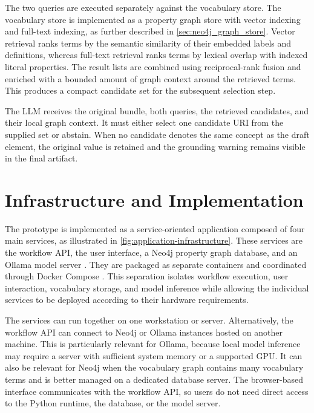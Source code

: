 
The two queries are executed separately against the vocabulary store.
The vocabulary store is implemented as a property graph store with vector indexing and full-text indexing, as further described in \cref{sec:neo4j_graph_store}.
Vector retrieval ranks terms by the semantic similarity of their embedded labels and definitions, whereas full-text retrieval ranks terms by lexical overlap with indexed literal properties.
The result lists are combined using reciprocal-rank fusion and enriched with a bounded amount of graph context around the retrieved terms.
This produces a compact candidate set for the subsequent selection step.

The \ac{LLM} receives the original bundle, both queries, the retrieved candidates, and their local graph context.
It must either select one candidate URI from the supplied set or abstain.
When no candidate denotes the same concept as the draft element, the original value is retained and the grounding warning remains visible in the final artifact.


\section{Infrastructure and Implementation}
\label{sec:infrastructure_and_implementation}

The prototype is implemented as a service-oriented application composed of four main services, as illustrated in \cref{fig:application-infrastructure}.
These services are the workflow \ac{API}, the user interface, a Neo4j property graph database, and an Ollama model server \cite{neo4jdatabase, ollamaplatform}.
They are packaged as separate containers and coordinated through Docker Compose \cite{docker_compose_patterns}.
This separation isolates workflow execution, user interaction, vocabulary storage, and model inference while allowing the individual services to be deployed according to their hardware requirements.

The services can run together on one workstation or server.
Alternatively, the workflow \ac{API} can connect to Neo4j or Ollama instances hosted on another machine.
This is particularly relevant for Ollama, because local model inference may require a server with sufficient system memory or a supported \ac{GPU}.
It can also be relevant for Neo4j when the vocabulary graph contains many vocabulary terms and is better managed on a dedicated database server.
The browser-based interface communicates with the workflow \ac{API}, so users do not need direct access to the Python runtime, the database, or the model server.

